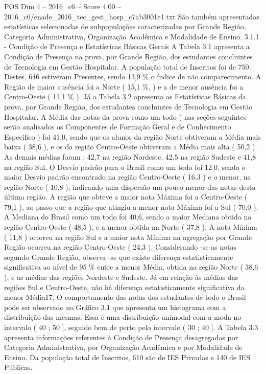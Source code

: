\begin{textsample}{POS Dim 4 – 2016\_c6 – Score 4.00 – 2016\_c6/enade\_2016\_tec\_gest\_hosp\_c7ab3001e1.txt}
São também apresentadas estatísticas selecionadas de subpopulações caracterizadas por Grande Região, Categoria Administrativa, Organização Acadêmica e Modalidade de Ensino. 3.1.1 - Condição de Presença e Estatísticas Básicas Gerais A Tabela 3.1 apresenta a Condição de Presença na prova, por Grande Região, dos estudantes concluintes de Tecnologia em Gestão Hospitalar.
A população total de Inscritos foi de 750.
Destes, 646 estiveram Presentes, sendo 13,9 \% o índice de não comparecimento.
A Região de maior ausência foi a Norte ( 15,1 \%, ) e a de menor ausência foi a Centro-Oeste ( 11,1 \% ).
Já a Tabela 3.2 apresenta as Estatísticas Básicas da prova, por Grande Região, dos estudantes concluintes de Tecnologia em Gestão Hospitalar.
A Média das notas da prova como um todo ( nas seções seguintes serão analisados os Componentes de Formação Geral e de Conhecimento Específico ) foi 41,0, sendo que os alunos da região Norte obtiveram a Média mais baixa ( 38,6 ), e os da região Centro-Oeste obtiveram a Média mais alta ( 50,2 ).
As demais médias foram : 42,7 na região Nordeste, 42,5 na região Sudeste e 41,8 na região Sul.
O Desvio padrão para o Brasil como um todo foi 12,0, sendo o maior Desvio padrão encontrado na região Centro-Oeste ( 16,3 ) e o menor, na região Norte ( 10,8 ), indicando uma dispersão um pouco menor das notas desta última região.
A região que obteve a maior nota Máxima foi a Centro-Oeste ( 79,1 ), ao passo que a região que atingiu a menor nota Máxima foi a Sul ( 70,0 ).
A Mediana do Brasil como um todo foi 40,6, sendo a maior Mediana obtida na região Centro-Oeste ( 48,5 ), e a menor obtida na Norte ( 37,8 ).
A nota Mínima ( 11,8 ) ocorreu na região Sul e a maior nota Mínima na agregação por Grande Região ocorreu na região Centro-Oeste ( 24,3 ).
Considerando -se as notas segundo Grande Região, observa -se que existe diferença estatisticamente significativa ao nível de 95 \% entre a menor Média, obtida na região Norte ( 38,6 ), e as médias das regiões Nordeste e Sudeste.
Já em relação às médias das regiões Sul e Centro-Oeste, não há diferença estatisticamente significativa da menor Média17.
O comportamento das notas dos estudantes de todo o Brasil pode ser observado no Gráfico 3.1 que apresenta um histograma com a distribuição das mesmas.
Essa é uma distribuição unimodal com a moda no intervalo ( 40 ; 50 ], seguido bem de perto pelo intervalo ( 30 ; 40 ].
A Tabela 3.3 apresenta informações referentes à Condição de Presença desagregadas por Categoria Administrativa, por Organização Acadêmica e por Modalidade de Ensino.
Da população total de Inscritos, 610 são de IES Privadas e 140 de IES Públicas.

\end{textsample}
